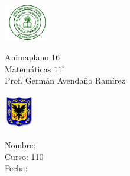 \documentclass[letterpaper,11pt,twoside]{article}
\author{Germ\'an Dar\'io Avenda\~no Ram\'irez, Lic. - M.Sc.}
\date{}
\begin{document}
\thispagestyle{empty}
\begin{minipage}{.10\textwidth}\includegraphics[height=1.6cm]{Images/logo-colegio.png}
\end{minipage}\hfill
\begin{minipage}{.38\textwidth}
\Large Animaplano 16\\
Matemáticas $11^{\circ}$\\
\large Prof. Germán Avendaño Ramírez
\end{minipage}
\hfill
\begin{minipage}{.09\textwidth}
\includegraphics[height=1.5cm]{Images/logo-sed.png} 
\end{minipage}\hfill
\begin{minipage}{.39\textwidth}
\large Nombre: \hrulefill\\
Curso: 110\underline{\hspace*{12pt}}\\
Fecha: \underline{\hspace{120pt}}
\end{minipage}
\vspace*{12pt}
\end{document}
